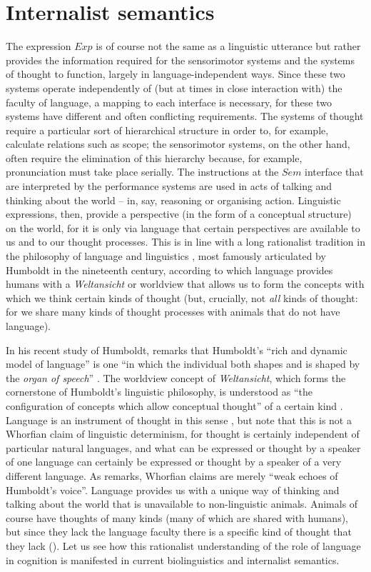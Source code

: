 \section{Internalist semantics}
The expression $Exp$ is of course not the same as a linguistic utterance but rather provides the information required for the sensorimotor systems and the systems of thought to function, largely in language-independent ways. Since these two systems operate independently of (but at times in close interaction with) the faculty of language, a mapping to each interface is necessary, for these two systems have different and often conflicting requirements. The systems of thought require a particular sort of hierarchical structure in order to, for example, calculate relations such as scope; the sensorimotor systems, on the other hand, often require the elimination of this hierarchy because, for example, pronunciation must take place serially. The instructions at the $Sem$ interface that are interpreted by the performance systems are used in acts of talking and thinking about the world – in, say, reasoning or organising action. Linguistic expressions, then, provide a perspective (in the form of a conceptual structure) on the world, for it is only via language that certain perspectives are available to us and to our thought processes. This is in line with a long rationalist tradition in the philosophy of language and linguistics \citep{Chomsky1966}, most famously articulated by Humboldt in the nineteenth century, according to which language provides humans with a \textit{Weltansicht} or worldview that allows us to form the concepts with which we think certain kinds of thought (but, crucially, not \textit{all} kinds of thought: for we share many kinds of thought processes with animals that do not have language). 
	
In his recent study of Humboldt, \citet{Underhill2009} remarks that Humboldt’s “rich and dynamic model of language” is one “in which the individual both shapes and is shaped by the \textit{organ of speech}” \citep[xi, emphasis in original]{Underhill2009}. The worldview concept of \textit{Weltansicht}, which forms the cornerstone of Humboldt’s linguistic philosophy, is understood as “the configuration of concepts which allow conceptual thought” of a certain kind \citep[56]{Underhill2009}. Language is an instrument of thought in this sense \citep{Asoulin2016}, but note that this is not a Whorfian claim of linguistic determinism, for thought is certainly independent of particular natural languages, and what can be expressed or thought by a speaker of one language can certainly be expressed or thought by a speaker of a very different language. As \citet[57]{Underhill2009} remarks, Whorfian claims are merely “weak echoes of Humboldt’s voice”. Language provides us with a unique way of thinking and talking about the world that is unavailable to non-linguistic animals. Animals of course have thoughts of many kinds (many of which are shared with humans), but since they lack the language faculty there is a specific kind of thought that they lack (\citealt{Hinzen2013,Asoulin2019}). Let us see how this rationalist understanding of the role of language in cognition is manifested in current biolinguistics and internalist semantics.


